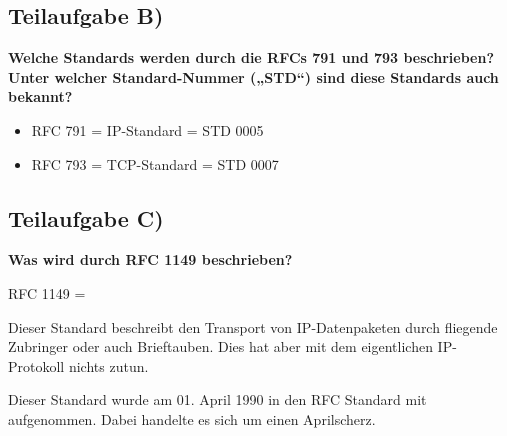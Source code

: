 \subsection{Teilaufgabe B)}
\textbf{Welche Standards werden durch die RFCs 791 und 793 beschrieben? Unter welcher
Standard-Nummer („STD“) sind diese Standards auch bekannt?}

\begin{itemize}
  \item RFC 791 = IP-Standard = STD 0005
  \item RFC 793 = TCP-Standard = STD 0007
\end{itemize}

\subsection{Teilaufgabe C)}
\textbf{Was wird durch RFC 1149 beschrieben?}

RFC 1149 = 

Dieser Standard beschreibt den Transport von IP-Datenpaketen durch fliegende
Zubringer oder auch Brieftauben. Dies hat aber mit dem eigentlichen
IP-Protokoll nichts zutun.

Dieser Standard wurde am 01. April 1990 in den RFC Standard mit aufgenommen.
Dabei handelte es sich um einen Aprilscherz.
\clearpage 